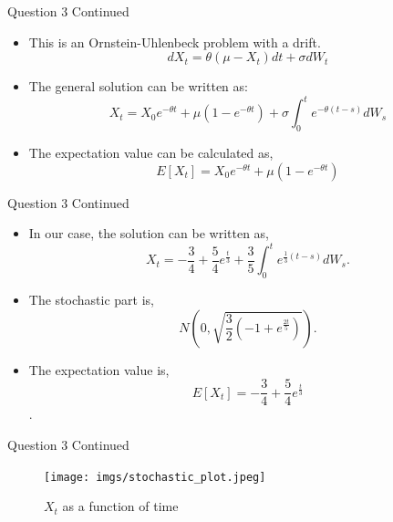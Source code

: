 \documentclass[compress,12pt]{beamer}
\begin{document}
\begin{frame}{Question 3 Continued}
    \begin{itemize}
        \item This is an Ornstein-Uhlenbeck problem with a drift.
        $$dX_t=\theta (\mu -X_t)dt+\sigma dW_t$$
        \item The general solution can be written as:
        $$X_t=X_0e^{-\theta t}+\mu (1-e^{-\theta t})+\sigma \int_0^t e^{-\theta(t-s)}dW_s$$
        \item The expectation value can be calculated as,
        $$E[X_t]=X_0e^{-\theta t}+\mu (1-e^{-\theta t})$$
    \end{itemize}
    
\end{frame}

\begin{frame}{Question 3 Continued}
    \begin{itemize}
        \item In our case, the solution can be written as,
        $$X_t=-\frac{3}{4}+\frac{5}{4}e^{\frac{t}{3}}+\frac{3}{5}\int_0^t e^{\frac{1}{3}(t-s)}dW_s.$$
        \item The stochastic part is, $$N(0,\sqrt{\frac{3}{2}(-1+e^{\frac{2t}{5}})}).$$
        \item The expectation value is,
        $$E[X_t]=-\frac{3}{4}+\frac{5}{4}e^{\frac{t}{3}}$$.
    \end{itemize}
    

\end{frame}


\begin{frame}{Question 3 Continued}
    \begin{figure}
        \centering
        \texttt{[image: imgs/stochastic\_plot.jpeg]}
        \caption{$X_t$ as a function of time}
    \end{figure}

\end{frame}
\end{document}
